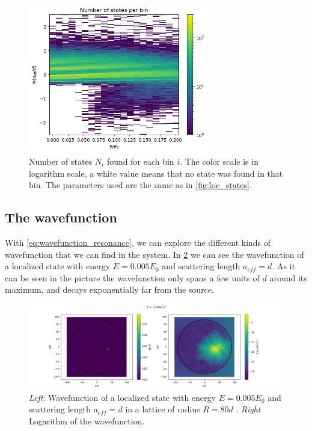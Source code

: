 \begin{figure}[ht]
    \centering
    \includegraphics[width=0.7\textwidth]{img/statistics.png}
    \caption{Number of states $N_i$ found for each bin $i$. The color scale is in logarithm scale, a white value means that no state was found in that bin. The parameters used are the same as in \cref{fig:loc_states}.}
    \label{fig:num_states}
\end{figure}
\clearpage

\subsection{The wavefunction}

With \cref{eq:wavefunction_resonance}, we can explore the different kinds of wavefunction that we can find in the system. In \cref{fig:localized_state} we can see the wavefunction of a localized state with energy $E=0.005E_0$ and scattering length $a_{eff}=d$. As it can be seen in the picture the wavefunction only spans a few units of $d$ around its maximum, and decays exponentially far from the source.

\begin{figure}[ht]
    \centering
    \includegraphics[width=1\linewidth]{img/loc_both.png}
    \caption{\textit{Left}: Wavefunction of a localized state with energy $E=0.005E_0$ and scattering length $a_{eff}=d$ in a lattice of radius $R=80d$ . \textit{Right} Logarithm of the wavefunction. }
    \label{fig:localized_state}
\end{figure}

